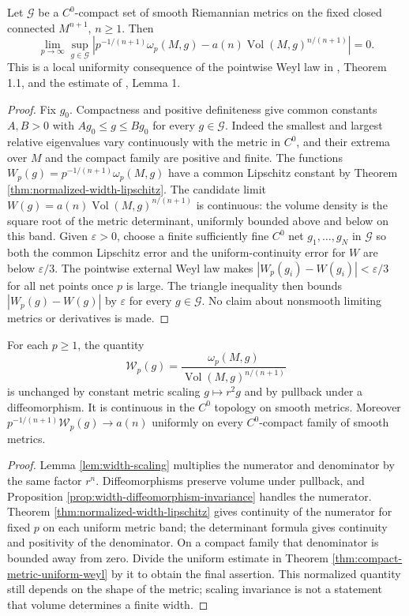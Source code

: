 \begin{theorem}\label{thm:compact-metric-uniform-weyl}
Let $\mathcal G$ be a $C^0$-compact set of smooth Riemannian metrics on the fixed closed connected $M^{n+1}$, $n\geq1$. Then
\[
 \lim_{p\to\infty}\sup_{g\in\mathcal G}
 \left|p^{-1/(n+1)}\omega_p(M,g)
 -a(n)\operatorname{Vol}(M,g)^{n/(n+1)}\right|=0.
\]
This is a local uniformity consequence of the pointwise Weyl law in \cite{LMN}, Theorem 1.1, and the estimate of \cite{MNS19}, Lemma 1.
\end{theorem}
\begin{proof}
Fix $g_0$. Compactness and positive definiteness give common constants $A,B>0$ with $Ag_0\leq g\leq Bg_0$ for every $g\in\mathcal G$. Indeed the smallest and largest relative eigenvalues vary continuously with the metric in $C^0$, and their extrema over $M$ and the compact family are positive and finite. The functions $W_p(g)=p^{-1/(n+1)}\omega_p(M,g)$ have a common Lipschitz constant by Theorem \ref{thm:normalized-width-lipschitz}. The candidate limit $W(g)=a(n)\operatorname{Vol}(M,g)^{n/(n+1)}$ is continuous: the volume density is the square root of the metric determinant, uniformly bounded above and below on this band.
Given $\varepsilon>0$, choose a finite sufficiently fine $C^0$ net $g_1,\ldots,g_N$ in $\mathcal G$ so both the common Lipschitz error and the uniform-continuity error for $W$ are below $\varepsilon/3$. The pointwise external Weyl law makes $|W_p(g_i)-W(g_i)|<\varepsilon/3$ for all net points once $p$ is large. The triangle inequality then bounds $|W_p(g)-W(g)|$ by $\varepsilon$ for every $g\in\mathcal G$. No claim about nonsmooth limiting metrics or derivatives is made.
\end{proof}

\begin{proposition}\label{prop:volume-normalized-width}
For each $p\geq1$, the quantity
\[
 \mathcal W_p(g)=\frac{\omega_p(M,g)}{\operatorname{Vol}(M,g)^{n/(n+1)}}
\]
is unchanged by constant metric scaling $g\mapsto r^2g$ and by pullback under a diffeomorphism. It is continuous in the $C^0$ topology on smooth metrics. Moreover $p^{-1/(n+1)}\mathcal W_p(g)\to a(n)$ uniformly on every $C^0$-compact family of smooth metrics.
\end{proposition}
\begin{proof}
Lemma \ref{lem:width-scaling} multiplies the numerator and denominator by the same factor $r^n$. Diffeomorphisms preserve volume under pullback, and Proposition \ref{prop:width-diffeomorphism-invariance} handles the numerator. Theorem \ref{thm:normalized-width-lipschitz} gives continuity of the numerator for fixed $p$ on each uniform metric band; the determinant formula gives continuity and positivity of the denominator. On a compact family that denominator is bounded away from zero. Divide the uniform estimate in Theorem \ref{thm:compact-metric-uniform-weyl} by it to obtain the final assertion. This normalized quantity still depends on the shape of the metric; scaling invariance is not a statement that volume determines a finite width.
\end{proof}

